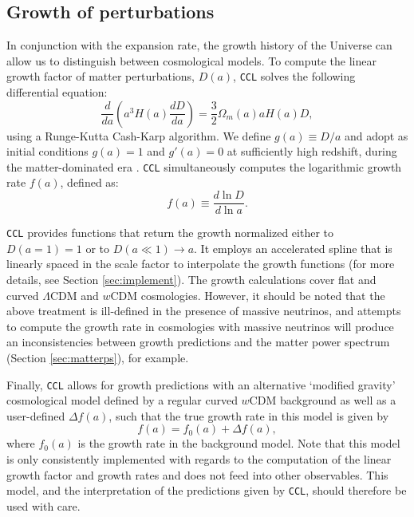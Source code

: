 \documentclass[\docopts]{\docclass}
\newcommand{\ccl}{{\tt CCL}\xspace}
\begin{document}
\subsection{Growth of perturbations}
\label{sec:growth}

In conjunction with the expansion rate, the growth history of the Universe can allow us to distinguish between cosmological models. To compute the linear growth factor of matter perturbations, $D(a)$, \ccl solves the following differential equation:
\begin{equation}
  \frac{d}{da}\left(a^3H(a)\frac{dD}{da}\right)=\frac{3}{2}\Omega_m(a)aH(a)D,
  \label{eq:growth}
\end{equation}
using a Runge-Kutta Cash-Karp algorithm. We define $g(a)\equiv D/a$ and adopt as initial conditions $g(a)=1$ and $g'(a)=0$ at sufficiently high redshift, during the matter-dominated era \citep{Cooray04}. \ccl simultaneously computes the logarithmic growth rate $f(a)$, defined as:
\begin{equation}
  f(a)\equiv \frac{d\ln D}{d\ln a}.
  \label{eq:lingrowthf}
\end{equation}

\ccl provides functions that return the growth normalized either to $D(a=1)=1$ or to $D(a\ll1)\rightarrow a$. It employs an accelerated spline that is linearly spaced in the scale factor to interpolate the growth functions (for more details, see Section \ref{sec:implement}). The growth calculations cover flat and curved $\Lambda$CDM and $w$CDM cosmologies. However, it should be noted that the above treatment is ill-defined in the presence of massive neutrinos, and attempts to compute the growth rate in cosmologies with massive neutrinos will produce an inconsistencies between growth predictions and the matter power spectrum (Section \ref{sec:matterps}), for example.

Finally, \ccl allows for growth predictions with an alternative `modified gravity' cosmological model defined by a regular curved $w$CDM background as well as a user-defined $\Delta f(a)$, such that the true growth rate in this model is given by
\begin{equation}
  f(a)=f_0(a)+\Delta f(a),
\label{eq:mgrowth}
\end{equation}
where $f_0(a)$ is the growth rate in the background model. Note that this model is only consistently implemented with regards to the computation of the linear growth factor and growth rates and does not feed into other observables. This model, and the interpretation of the predictions given by \ccl, should therefore be used with care. 
\end{document}
